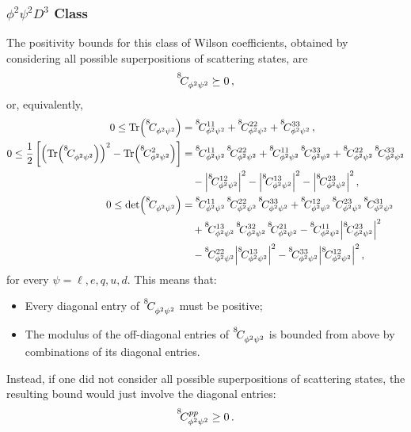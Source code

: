 \subsubsection{$\phi^2 \psi^2 D^3$ Class}
The positivity bounds for this class of Wilson coefficients, obtained by considering all possible superpositions of scattering states, are
\begin{equation}
    \coef{8}{\phi^2\psi^2}{} \succeq 0\,,
\end{equation}
or, equivalently,
\begin{align}
\label{eq:pos_d8_phi2psi2_1}
    0\le \Tr (\coef{8}{\phi^2 \psi^2}{}) &= \coef{8}{\phi^2 \psi^2}{11}+\coef{8}{\phi^2 \psi^2}{22}+\coef{8}{\phi^2 \psi^2}{33}\,,
    \\
    0 \le \frac{1}{2}\left[\left(\Tr (\coef{8}{\phi^2 \psi^2}{}) \right)^2 - \Tr (\coef{8}{\phi^2 \psi^2}{2})\right] &= \coef{8}{\phi^2 \psi^2}{11}\,\coef{8}{\phi^2 \psi^2}{22}+\coef{8}{\phi^2 \psi^2}{11}\,\coef{8}{\phi^2 \psi^2}{33}+\coef{8}{\phi^2 \psi^2}{22}\,\coef{8}{\phi^2 \psi^2}{33}\nonumber \\&\quad -\abs{\coef{8}{\phi^2 \psi^2}{12}}^2-\abs{\coef{8}{\phi^2 \psi^2}{13}}^2-\abs{\coef{8}{\phi^2 \psi^2}{23}}^2\,, \label{eq:pos_d8_phi2psi2_2} \\
    0\le \det (\coef{8}{\phi^2 \psi^2}{}) &= \coef{8}{\phi^2 \psi^2}{11}\,\coef{8}{\phi^2 \psi^2}{22}\,\coef{8}{\phi^2 \psi^2}{33}+\coef{8}{\phi^2 \psi^2}{12}\,\coef{8}{\phi^2 \psi^2}{23}\,\coef{8}{\phi^2 \psi^2}{31}\nonumber \\
    &\quad+
    \coef{8}{\phi^2 \psi^2}{13}\,\coef{8}{\phi^2 \psi^2}{32}\,\coef{8}{\phi^2 \psi^2}{21}
    -\coef{8}{\phi^2 \psi^2}{11}\abs{\coef{8}{\phi^2 \psi^2}{23}}^2\nonumber \\
    &\quad-\coef{8}{\phi^2 \psi^2}{22}\abs{\coef{8}{\phi^2 \psi^2}{13}}^2-\coef{8}{\phi^2 \psi^2}{33}\abs{\coef{8}{\phi^2 \psi^2}{12}}^2\,, \label{eq:pos_d8_phi2psi2_3}
\end{align}
for every $\psi = \ell,e,q,u,d$.
This means that:
\begin{itemize}
    \item Every diagonal entry of $\coef{8}{\phi^2 \psi^2}{}$ must be positive;
    \item The modulus of the off-diagonal entries of $\coef{8}{\phi^2 \psi^2}{}$ is bounded from above by combinations of its diagonal entries.
\end{itemize}
Instead, if one did not consider all possible superpositions of scattering states, the resulting bound would just involve the diagonal entries:
\begin{equation}
    \coef{8}{\phi^2 \psi^2}{pp} \ge 0\,.
\end{equation}

